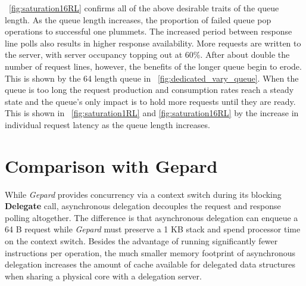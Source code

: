 \documentclass{uicthesi}
\begin{document}
~\ref{fig:saturation16RL} confirms all of the above desirable traits of the queue length. As the queue length increases, the proportion of failed queue pop operations to successful one plummets. The increased period between response line polls also results in higher response availability. More requests are written to the server, with server occupancy topping out at 60\%. After about double the number of request lines, however, the benefits of the longer queue begin to erode. This is shown by the 64 length queue in ~\ref{fig:dedicated_vary_queue}. When the queue is too long the request production and consumption rates reach a steady state and the queue's only impact is to hold more requests until they are ready. This is shown in ~\ref{fig:saturation1RL} and \ref{fig:saturation16RL} by the increase in individual request latency as the queue length increases. 

\section{Comparison with Gepard}
While \textit{Gepard} provides concurrency via a context switch during its blocking \textbf{Delegate} call, asynchronous delegation decouples the request and response polling altogether. The difference is that asynchronous delegation can enqueue a 64 B  request while \textit{Gepard} must preserve a 1 KB stack and spend processor time on the context switch. Besides the advantage of running significantly fewer instructions per operation, the much smaller memory footprint of asynchronous delegation increases the amount of cache available for delegated data structures when sharing a physical core with a delegation server.  %
\end{document}
